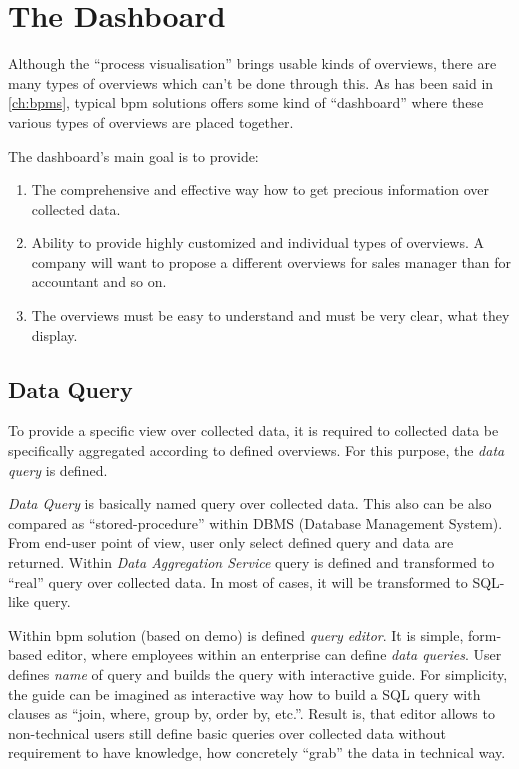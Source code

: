 \section{The Dashboard}
Although the ``process visualisation'' brings usable kinds of overviews, there are many types of overviews which can't be done through this. As has been said in \cref{ch:bpms}, typical \gls{bpm} solutions offers some kind of ``dashboard'' where these various types of overviews are placed together. 

The dashboard's main goal is to provide:
\begin{enumerate}
\item The comprehensive and effective way how to get precious information over collected data.
\item Ability to provide highly customized and individual types of overviews. A company will want to propose a different overviews for sales manager than for accountant and so on. 
\item The overviews must be easy to understand and must be very clear, what they display.
\end{enumerate}

\subsection{Data Query}
To provide a specific view over collected data, it is required to collected data be specifically aggregated according to defined overviews. For this purpose, the \textit{data query} is defined.

\textit{Data Query} is basically named query over collected data. This also can be also compared as ``stored-procedure'' within DBMS (Database Management System). From end-user point of view, user only select defined query and data are returned. Within \textit{Data Aggregation Service} query is defined and transformed to ``real'' query over collected data. In most of cases, it will be transformed to SQL-like query. 

Within \gls{bpm} solution (based on \gls{demo}) is defined \textit{query editor}. It is simple, form-based editor, where employees within an enterprise can define \textit{data queries}. User defines \textit{name} of query and builds the query with interactive guide. For simplicity, the guide can be imagined as interactive way how to build a SQL query with clauses as ``join, where, group by, order by, etc.''. Result is, that editor allows to non-technical users still define basic queries over collected data without requirement to have knowledge, how concretely ``grab'' the data in technical way. 

